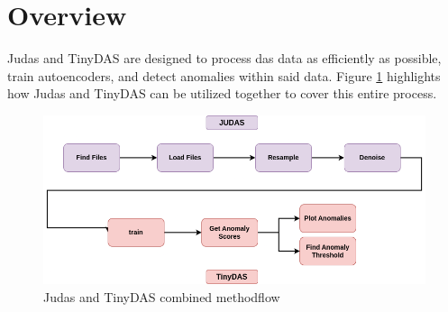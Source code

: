 \section{Overview}
Judas and TinyDAS are designed to process \acrshort{das} data as efficiently as possible, train autoencoders, and detect anomalies within said data. Figure \ref{fig:judasnet_overview} highlights how Judas and TinyDAS can be utilized together to cover this entire process.
\begin{figure}[!h]
    \centering
    \includegraphics[scale=.5]{figures/api_overview.png}
    \caption{Judas and TinyDAS combined methodflow}
    \label{fig:judasnet_overview}
\end{figure}